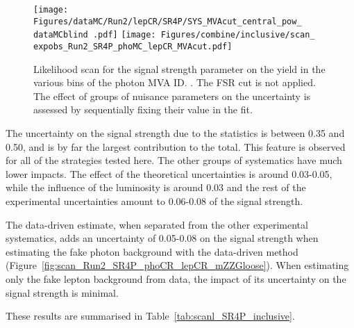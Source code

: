 \begin{figure}
  \centering
  \texttt{[image: Figures/dataMC/Run2/lepCR/SR4P/SYS\_MVAcut\_central\_pow\_\\dataMCblind .pdf]}
  \hfill
  \texttt{[image: Figures/combine/inclusive/scan\_\\expobs\_Run2\_SR4P\_phoMC\_lepCR\_MVAcut.pdf]}
  \caption{Likelihood scan for the signal strength parameter
    on the yield in the various bins of the photon MVA ID.
    .
    The FSR cut is not applied.
    The effect of groups of nuisance parameters on the uncertainty is assessed by sequentially fixing their value in the fit.
  }
  \label{fig:scan_Run2_SR4P_phoMC_lepCR_MVAcut}
\end{figure}

The uncertainty on the signal strength due to the statistics is between 0.35 and 0.50,
and is by far the largest contribution to the total.
This feature is observed for all of the strategies tested here.
The other groups of systematics have much lower impacts.
The effect of the theoretical uncertainties is around 0.03-0.05,
while the influence of the luminosity is around 0.03
and the rest of the experimental uncertainties amount to 0.06-0.08 of the signal strength.

The data-driven estimate, when separated from the other experimental systematics,
adds an uncertainty of 0.05-0.08 on the signal strength when estimating the fake photon background
with the data-driven method (Figure~\ref{fig:scan_Run2_SR4P_phoCR_lepCR_mZZGloose}).
When estimating only the fake lepton background from data, the impact of its uncertainty on the signal strength is minimal.

These results are summarised in Table~\ref{tab:scanl_SR4P_inclusive}.

